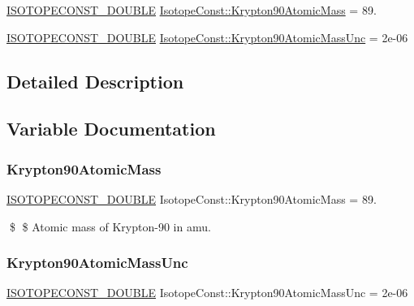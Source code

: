 \begin{DoxyCompactItemize}
\item 
\mbox{\hyperlink{group___isotope_const-_macros_ga8f45a7272ce02c0b4c65c44636ed719a}{I\+S\+O\+T\+O\+P\+E\+C\+O\+N\+S\+T\+\_\+\+D\+O\+U\+B\+LE}} \mbox{\hyperlink{group___isotope_const-_krypton-_kr90_gaeb9d8b3aea62c4705287d88efa2ba3c3}{Isotope\+Const\+::\+Krypton90\+Atomic\+Mass}} = 89.
\item 
\mbox{\hyperlink{group___isotope_const-_macros_ga8f45a7272ce02c0b4c65c44636ed719a}{I\+S\+O\+T\+O\+P\+E\+C\+O\+N\+S\+T\+\_\+\+D\+O\+U\+B\+LE}} \mbox{\hyperlink{group___isotope_const-_krypton-_kr90_gaf28ed42576a9e7247a4bc5083f369601}{Isotope\+Const\+::\+Krypton90\+Atomic\+Mass\+Unc}} = 2e-\/06
\end{DoxyCompactItemize}


\subsection{Detailed Description}


\subsection{Variable Documentation}
\mbox{\label{group___isotope_const-_krypton-_kr90_gaeb9d8b3aea62c4705287d88efa2ba3c3}} 
\subsubsection{\texorpdfstring{Krypton90\+Atomic\+Mass}{Krypton90AtomicMass}}
{\footnotesize\ttfamily \mbox{\hyperlink{group___isotope_const-_macros_ga8f45a7272ce02c0b4c65c44636ed719a}{I\+S\+O\+T\+O\+P\+E\+C\+O\+N\+S\+T\+\_\+\+D\+O\+U\+B\+LE}} Isotope\+Const\+::\+Krypton90\+Atomic\+Mass = 89.}

\$ \$ Atomic mass of Krypton-\/90 in amu. \mbox{\label{group___isotope_const-_krypton-_kr90_gaf28ed42576a9e7247a4bc5083f369601}} 
\subsubsection{\texorpdfstring{Krypton90\+Atomic\+Mass\+Unc}{Krypton90AtomicMassUnc}}
{\footnotesize\ttfamily \mbox{\hyperlink{group___isotope_const-_macros_ga8f45a7272ce02c0b4c65c44636ed719a}{I\+S\+O\+T\+O\+P\+E\+C\+O\+N\+S\+T\+\_\+\+D\+O\+U\+B\+LE}} Isotope\+Const\+::\+Krypton90\+Atomic\+Mass\+Unc = 2e-\/06}

